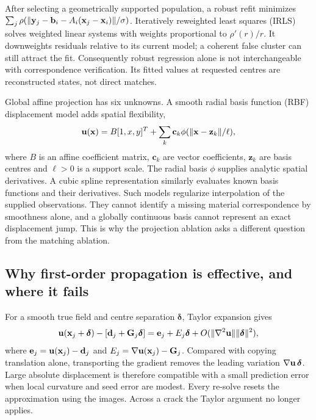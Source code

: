 After selecting a geometrically supported population, a robust refit minimizes $\sum_j\rho(\|\mathbf y_j-\mathbf b_i-A_i(\mathbf x_j-\mathbf x_i)\|/\sigma)$. Iteratively reweighted least squares (IRLS) solves weighted linear systems with weights proportional to $\rho'(r)/r$. It downweights residuals relative to its current model; a coherent false cluster can still attract the fit. Consequently robust regression alone is not interchangeable with correspondence verification. Its fitted values at requested centres are reconstructed states, not direct matches.

Global affine projection has six unknowns. A smooth radial basis function (RBF) displacement model adds spatial flexibility,
\begin{equation}
\mathbf u(\mathbf x)=B[1,x,y]^T+\sum_k\mathbf c_k\phi(\|\mathbf x-\mathbf z_k\|/\ell),
\end{equation}
where $B$ is an affine coefficient matrix, $\mathbf c_k$ are vector coefficients, $\mathbf z_k$ are basis centres and $\ell>0$ is a support scale. The radial basis $\phi$ supplies analytic spatial derivatives. A cubic spline representation similarly evaluates known basis functions and their derivatives. Such models regularize interpolation of the supplied observations. They cannot identify a missing material correspondence by smoothness alone, and a globally continuous basis cannot represent an exact displacement jump. This is why the projection ablation asks a different question from the matching ablation.

\subsection{Why first-order propagation is effective, and where it fails}
For a smooth true field and centre separation $\boldsymbol\delta$, Taylor expansion gives
\begin{equation}
\mathbf u(\mathbf x_j+\boldsymbol\delta)-[\mathbf d_j+\mathbf G_j\boldsymbol\delta]
=\mathbf e_j+E_j\boldsymbol\delta+O(\|\nabla^2\mathbf u\|\|\boldsymbol\delta\|^2),
\end{equation}
where $\mathbf e_j=\mathbf u(\mathbf x_j)-\mathbf d_j$ and $E_j=\nabla\mathbf u(\mathbf x_j)-\mathbf G_j$. Compared with copying translation alone, transporting the gradient removes the leading variation $\nabla\mathbf u\,\boldsymbol\delta$. Large absolute displacement is therefore compatible with a small prediction error when local curvature and seed error are modest. Every re-solve resets the approximation using the images. Across a crack the Taylor argument no longer applies.

